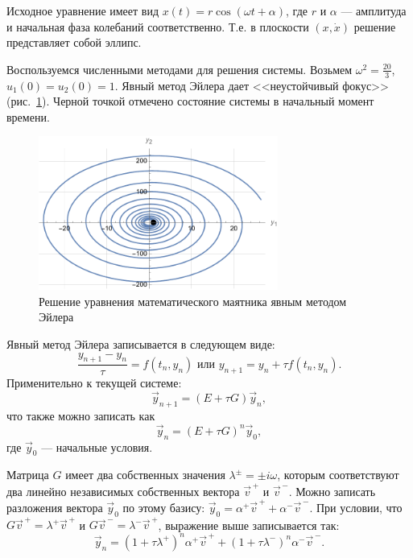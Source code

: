 \documentclass[12pt, a4paper]{article}
\begin{document}
	Исходное уравнение имеет вид $x(t) = r \cos(\omega t + \alpha)$, где $r$ и $\alpha$ --- амплитуда и начальная фаза колебаний соответственно. Т.е. в плоскости $(x, \dot{x})$ решение представляет собой эллипс.
	
	Воспользуемся численными методами для решения системы. Возьмем $\omega^2 = \frac{20}3$, $u_1(0) = u_2(0) = 1$. Явный метод Эйлера дает <<неустойчивый фокус>> (рис.~\ref{euler_expl_pend}). Черной точкой отмечено состояние системы в начальный момент времени.
	
	\begin{figure}[!h]
		\centering
		\includegraphics[width=0.7\textwidth]{euler_expl_pend}
		\caption{Решение уравнения математического маятника явным методом Эйлера}
		\label{euler_expl_pend}
	\end{figure}
	
	Явный метод Эйлера записывается в следующем виде:
	\begin{equation*}
		\frac{y_{n+1}-y_n}\tau = f(t_n, y_n) \textrm{ или } y_{n+1} = y_n + \tau f(t_n, y_n).
	\end{equation*}
	Применительно к текущей системе:
	\begin{equation*}
		\vec{y}_{n+1} = (E + \tau G) \vec{y}_n,
	\end{equation*}
	что также можно записать как
	\begin{equation*}
		\vec{y}_n = (E + \tau G)^n \vec{y}_0,
	\end{equation*}
	где $\vec{y}_0$ --- начальные условия.
	
	Матрица $G$ имеет два собственных значения $\lambda^{\pm} = \pm i \omega$, которым соответствуют два линейно независимых собственных вектора $\vec{v}^{\,+}$ и $\vec{v}^{\,-}$. Можно записать разложения вектора $\vec{y}_0$ по этому базису: $\vec{y}_0 = \alpha^+ \vec{v}^{\,+} + \alpha^- \vec{v}^{\,-}$. При условии, что $G \vec{v}^{\,+} = \lambda^+ \vec{v}^{\,+}$ и $G \vec{v}^{\,-} = \lambda^- \vec{v}^{\,+}$, выражение выше записывается так:
	\[
	\vec{y}_n = (1+\tau\lambda^+)^n \alpha^+ \vec{v}^{\,+} + (1+\tau\lambda^-)^n \alpha^- \vec{v}^{\,-}.
	\]
	
\end{document}
